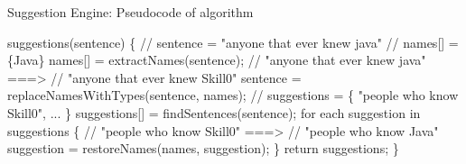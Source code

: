 \begin{frame}[fragile]{Suggestion Engine: Pseudocode of algorithm}
\begin{semiverbatim}\small
suggestions(sentence) \{
    \textcolor{Comment}{// sentence = "anyone that ever knew java"
    // names[] = \{Java\}}
    names[] = extractNames(sentence);\pause
    \vspace{-2mm} \textcolor{Comment}{
    // "anyone that ever knew java" ===> 
    // "anyone that ever knew Skill0"}
    sentence = replaceNamesWithTypes(sentence, names); \pause
    \vspace{-2mm}\textcolor{Comment}{
    // suggestions = \{ "people who know Skill0", ... \} }
    suggestions[] = findSentences(sentence);\pause
    \vspace{-2mm}
    for each suggestion in suggestions \{ \textcolor{Comment}{
    // "people who know Skill0" ===> 
    // "people who know Java"}
      suggestion = restoreNames(names, suggestion);
    \}
    return suggestions; 
\}
\end{semiverbatim}
\end{frame}